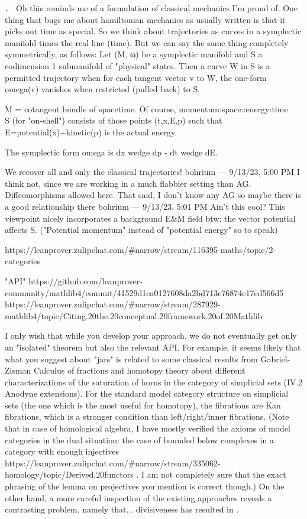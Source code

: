 \documentclass{book}
\newcounter{pcounter}
\newcounter{sectioncount}
\newcounter{subsectioncount}
\renewcommand{\subsection}[1]{\texttt{\thesubsectioncount . #1} \stepcounter{subsectioncount}}
\begin{document}
\iffalse
\subsection{}
Oh this reminds me of a formulation of classical mechanics I'm proud of. One thing that bugs me about hamiltonian mechanics as usually written is that it picks out time as special. So we think about trajectories as curves in a symplectic manifold times the real line (time). But we can say the same thing completely symmetrically, as follows:
Let (M, ω) be a symplectic manifold and S a codimension 1 submanifold of "physical" states.  Then a curve W in S is a permitted trajectory when for each tangent vector v to W, the one-form omega(v) vanishes when restricted (pulled back) to S.

M = cotangent bundle of spacetime.  Of course, momentum:space::energy:time\\

S (for "on-shell") consists of those points (t,x,E,p) such that E=potential(x)+kinetic(p) is the actual energy.

The symplectic form omega is dx wedge dp - dt wedge dE.

We recover all and only the classical trajectories!
bohrium — 9/13/23, 5:00 PM
I think not, since we are working in a much flabbier setting than AG.  Diffeomorphisms allowed here.
That said, I don't know any AG so maybe there is a good relationship there
bohrium — 9/13/23, 5:01 PM
Ain't this cool?
This viewpoint nicely incorporates a background E&M field btw: the vector potential affects S.
("Potential momentum" instead of "potential energy" so to speak)

https://leanprover.zulipchat.com/#narrow/stream/116395-maths/topic/2-categories

"API"
https://github.com/leanprover-community/mathlib4/commit/41529d1ea0127608da2bd713e76874e17ed566d5
https://leanprover.zulipchat.com/#narrow/stream/287929-mathlib4/topic/Citing.20the.20conceptual.20framework.20of.20Mathlib

I only wish that while you develop your approach, we do not eventually get only an "isolated" theorem but also the relevant API. For example, it seems likely that what you suggest about "jars" is related to some classical results from Gabriel-Zisman Calculus of fractions and homotopy theory about different characterizations of the saturation of horns in the category of simplicial sets (IV.2 Anodyne extensions).
For the standard model category structure on simplicial sets (the one which is the most useful for homotopy), the fibrations are Kan fibrations, which is a stronger condition than left/right/inner fibrations.
(Note that in case of homological algebra, I have mostly verified the axioms of model categories in the dual situation: the case of bounded below complexes in a category with enough injectives https://leanprover.zulipchat.com/#narrow/stream/335062-homology/topic/Derived.20functors . I am not completely sure that the exact phrasing of the lemma on projectives you mention is correct though.)
On the other hand, a more careful inspection of the existing approaches reveals a contrasting problem, namely that... divisiveness has resulted in .
\end{document}
